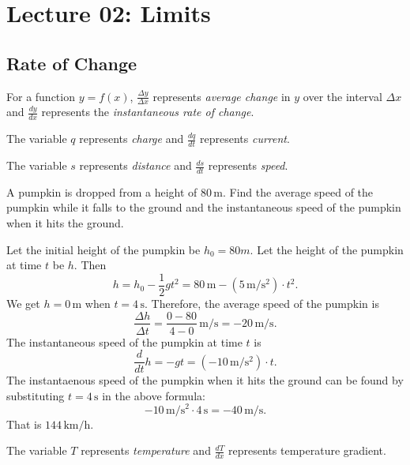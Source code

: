\section{Lecture 02: Limits}


\subsection{Rate of Change}

For a function \( y = f(x) \), \( \frac{\Delta y}{\Delta x} \)
represents \emph{average change} in \( y \) over the interval \( \Delta
x \) and \( \frac{dy}{dx} \) represents the \emph{instantaneous rate of
change}.

\begin{example}
The variable \( q \) represents \emph{charge} and \( \frac{dq}{dt} \)
represents \emph{current}.
\end{example}

\begin{example}
The variable \( s \) represents \emph{distance} and \( \frac{ds}{dt} \)
represents \emph{speed}.
\end{example}

\begin{problem}
A pumpkin is dropped from a height of \( 80\,\mathrm{m} \). Find the
average speed of the pumpkin while it falls to the ground and the
instantaneous speed of the pumpkin when it hits the ground.
\end{problem}
\begin{solution}
Let the initial height of the pumpkin be \( h_0 = 80 m \). Let the
height of the pumpkin at time \( t \) be \( h \). Then
\[
    h = h_0 - \frac{1}{2}gt^2
      = 80\,\mathrm{m} - (5\,\mathrm{m/s^2}) \cdot t^2.
\]
We get \( h = 0\,\mathrm{m} \) when \( t = 4\,\mathrm{s} \). Therefore,
the average speed of the pumpkin is
\[
    \frac{\Delta h}{\Delta t}
        = \frac{0 - 80}{4 - 0}\,\mathrm{m/s} = -20\,\mathrm{m/s}.
\]
The instantaneous speed of the pumpkin at time \( t \) is
\[
    \frac{d}{dt} h = -gt = (-10\,\mathrm{m/s^2}) \cdot t.
\]
The instantaenous speed of the pumpkin when it hits the ground can be
found by substituting \( t = 4\,\mathrm{s} \) in the above formula:
\[
    -10\,\mathrm{m/s^2} \cdot 4\,\mathrm{s} = -40\,\mathrm{m/s}.
\]
That is \( 144\,\mathrm{km/h} \).
\end{solution}

\begin{example}
The variable \( T \) represents \emph{temperature} and \( \frac{dT}{dx}
\) represents temperature gradient.
\end{example}

